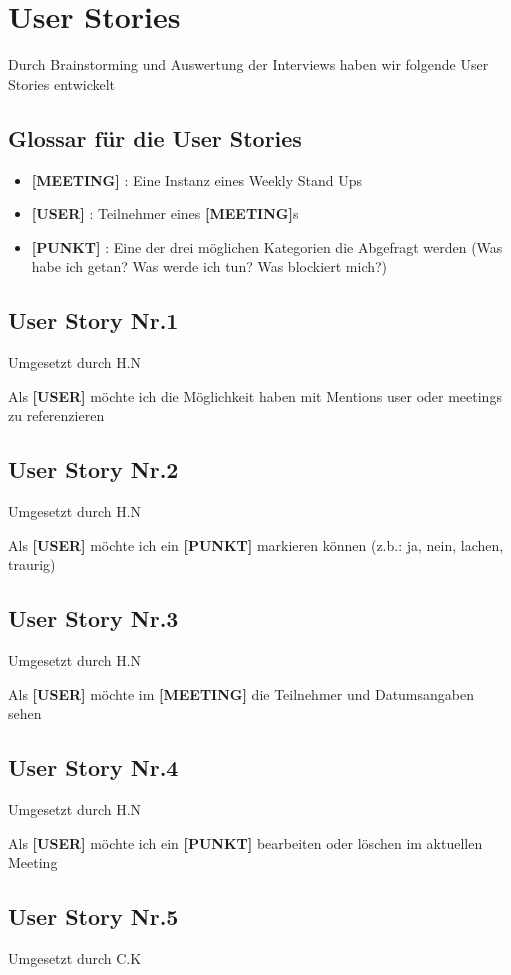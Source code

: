 \chapter{User Stories}

Durch Brainstorming und Auswertung der Interviews haben wir folgende User Stories entwickelt

\section{Glossar für die User Stories}
\begin{itemize}
\item \textbf{[MEETING]} : Eine Instanz eines Weekly Stand Ups
\item \textbf{[USER]} : Teilnehmer eines \textbf{[MEETING]}s 
\item \textbf{[PUNKT]} : Eine der drei möglichen Kategorien die Abgefragt werden (Was habe ich getan? Was werde ich tun? Was blockiert mich?)
\end{itemize}
\section{User Story Nr.1} 
{\tiny{Umgesetzt durch H.N}} 

Als \textbf{[USER]} möchte ich die Möglichkeit haben mit Mentions user oder meetings zu referenzieren

\section{User Story Nr.2}
{\tiny{Umgesetzt durch H.N}} 

Als \textbf{[USER]} möchte ich ein \textbf{[PUNKT]} markieren können (z.b.: ja, nein, lachen, traurig)
\section{User Story Nr.3}
{\tiny{Umgesetzt durch H.N}}

Als \textbf{[USER]} möchte im \textbf{[MEETING]} die Teilnehmer und Datumsangaben sehen
\section{User Story Nr.4 }
{\tiny{Umgesetzt durch H.N}} 

Als \textbf{[USER]} möchte ich ein \textbf{[PUNKT]} bearbeiten oder löschen im aktuellen Meeting
\section{User Story Nr.5}
{\tiny{Umgesetzt durch C.K}} 

